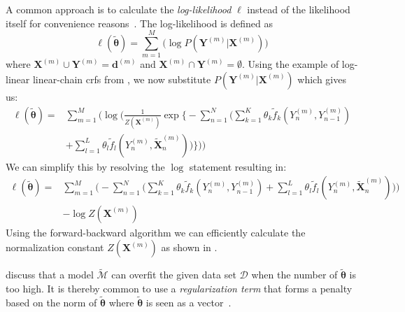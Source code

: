 A common approach is to calculate the \textit{log-likelihood} $\ell$ instead of the likelihood itself for convenience reasons~\citep{koller2009probabilistic,sutton2010introduction,mann2008generalized}.
The log-likelihood is defined as~\citep{sutton2010introduction}
\begin{equation}
  \label{equ:log-likelihood}
  \ell(\bm{\tilde{\theta}})=\sum_{m=1}^M \Big(\log P(\bm{Y}^{(m)}|\bm{X}^{(m)})\Big)
\end{equation}
where $\bm{X}^{(m)}\cup\bm{Y}^{(m)}=\bm{d}^{(m)}$ and $\bm{X}^{(m)}\cap\bm{Y}^{(m)}=\emptyset$.
Using the example of log-linear \glspl{linear-chain crf} from , we now substitute $P(\bm{Y}^{(m)}|\bm{X}^{(m)})$ which gives us:
\begin{equation}
  \label{equ:log-likelihood-linear-chain-crf-log-linear-1}
  \begin{split}
    \ell(\bm{\tilde{\theta}}) = & \sum_{m=1}^M \Bigg(\log \bigg(\frac{1}{Z(\bm{X}^{(m)})}\exp\Bigg\{ -\sum_{n=1}^N \Big(\sum_{k=1}^K\theta_k \tilde{f}_k(Y_n^{(m)},Y_{n-1}^{(m)}) \\
    & +\sum_{l=1}^L\theta_l \tilde{f}_l(Y_n^{(m)},\bm{\tilde{X}}_n^{(m)})\Big)\Bigg\}\bigg)\Bigg)
 \end{split}
\end{equation}
We can simplify this by resolving the $\log$ statement resulting in:
\begin{equation}
  \label{equ:log-likelihood-linear-chain-crf-log-linear-2}
  \begin{split}
    \ell(\bm{\tilde{\theta}}) = & \sum_{m=1}^M \bigg(-\sum_{n=1}^N \Big(\sum_{k=1}^K\theta_k \tilde{f}_k(Y_n^{(m)},Y_{n-1}^{(m)})+\sum_{l=1}^L\theta_l \tilde{f}_l(Y_n^{(m)},\bm{\tilde{X}}_n^{(m)})\Big)\Bigg) \\
    & -\log Z(\bm{X}^{(m)})
 \end{split}
\end{equation}
Using the forward-backward algorithm we can efficiently calculate the normalization constant $Z(\bm{X}^{(m)})$ as shown in .

\bigskip

\citet{sutton2010introduction} discuss that a model $\tilde{\mathcal{M}}$ can overfit the given data set $\mathcal{D}$ when the number of $\bm{\tilde{\theta}}$ is too high.
It is thereby common to use a \textit{regularization term} that forms a penalty based on the norm of $\bm{\tilde{\theta}}$ where $\bm{\tilde{\theta}}$ is seen as a vector~\citep{koller2009probabilistic,sutton2010introduction}.

